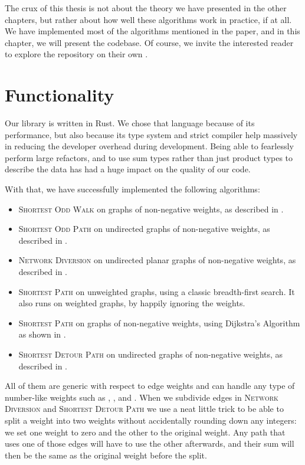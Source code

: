 The crux of this thesis is not about the theory we have presented in the other chapters, but rather about how well these algorithms work in practice, if at all. We have implemented most of the algorithms mentioned in the paper, and in this chapter, we will present the codebase. Of course, we invite the interested reader to explore the repository on their own \cite{source:codebase}.

\section{Functionality}
Our library is written in Rust. We chose that language because of its performance, but also because its type system and strict compiler help massively in reducing the developer overhead during development. Being able to fearlessly perform large refactors, and to use sum types rather than just product types to describe the data has had a huge impact on the quality of our code.

With that, we have successfully implemented the following algorithms:

\begin{itemize}
    \item \textsc{Shortest Odd Walk} on graphs of non-negative weights, as described in .
    \item \textsc{Shortest Odd Path} on undirected graphs of non-negative weights, as described in .
    \item \textsc{Network Diversion} on undirected planar graphs of non-negative weights, as described in .
    \item \textsc{Shortest Path} on unweighted graphs, using a classic breadth-first search. It also runs on weighted graphs, by happily ignoring the weights.
    \item \textsc{Shortest Path} on graphs of non-negative weights, using Dijkstra's Algorithm as shown in .
    \item \textsc{Shortest Detour Path} on undirected graphs of non-negative weights, as described in .
\end{itemize}

All of them are generic with respect to edge weights and can handle any type of number-like weights such as , , and . When we subdivide edges in \textsc{Network Diversion} and \textsc{Shortest Detour Path} we use a neat little trick to be able to split a weight into two weights without accidentally rounding down any integers: we set one weight to zero and the other to the original weight. Any path that uses one of those edges will have to use the other afterwards, and their sum will then be the same as the original weight before the split.
